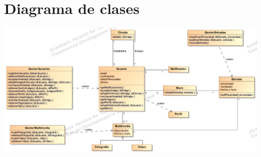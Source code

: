 \documentclass[12pt, a4paper, titlepage]{article}
\begin{document}
\newpage
\section{Diagrama de clases}\label{sec:Diagrama}

	

\begin{center}
	\includegraphics[scale=0.8,angle=90]{Imagenes/DiagramaClases}
\end{center}
\end{document}
